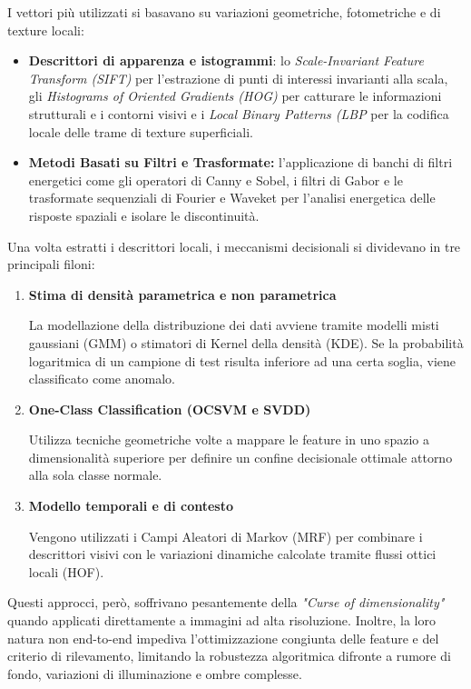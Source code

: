 I vettori più utilizzati si basavano su variazioni geometriche, fotometriche e di texture locali:
\begin{itemize}
    \item \textbf{Descrittori di apparenza e istogrammi}: lo \textit{Scale-Invariant Feature Transform (SIFT)} per l'estrazione di punti di interessi invarianti alla scala, gli \textit{Histograms of Oriented Gradients (HOG)} per catturare le informazioni strutturali e i contorni visivi e i \textit{Local Binary Patterns (LBP} per la codifica locale delle trame di texture superficiali.\cite{Yang_et_al._2021}\cite{Lian_et_al._2023}
    \item \textbf{Metodi Basati su Filtri e Trasformate:} l'applicazione di banchi di filtri energetici come gli operatori di Canny e Sobel, i filtri di Gabor e le trasformate sequenziali di Fourier e Waveket per l'analisi energetica delle risposte spaziali e isolare le discontinuità.\cite{Tran_et_al._2022}
\end{itemize}

Una volta estratti i descrittori locali, i meccanismi decisionali si dividevano in tre principali filoni:\cite{Yang_et_al._2021}
\begin{enumerate}
    \item \textbf{Stima di densità parametrica e non parametrica} 

    La modellazione della distribuzione dei dati avviene tramite modelli misti gaussiani (GMM) o stimatori di Kernel della densità (KDE). Se la probabilità logaritmica di un campione di test risulta inferiore ad una certa soglia, viene classificato come anomalo.

    \item \textbf{One-Class Classification (OCSVM e SVDD)}

    Utilizza tecniche geometriche volte a mappare le feature in uno spazio a dimensionalità superiore per definire un confine decisionale ottimale attorno alla sola classe normale.

    \item\textbf{Modello temporali e di contesto}

    Vengono utilizzati i Campi Aleatori di Markov (MRF) per combinare i descrittori visivi con le variazioni dinamiche calcolate tramite flussi ottici locali (HOF).
\end{enumerate}

Questi approcci, però, soffrivano pesantemente della \textit{"Curse of dimensionality"} quando applicati direttamente a immagini ad alta risoluzione. Inoltre, la loro natura non end-to-end impediva l'ottimizzazione congiunta delle feature e del criterio di rilevamento, limitando la robustezza algoritmica difronte a rumore di fondo, variazioni di illuminazione e ombre complesse.\cite{Yang_et_al._2021}

